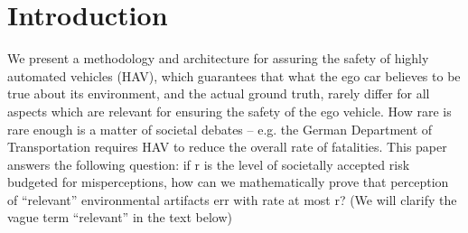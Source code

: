 \section{Introduction}

We present a methodology and architecture for assuring the safety of highly automated vehicles (HAV), which guarantees  that what the ego car believes to be true about its environment, and the actual ground truth, rarely differ for all aspects which are relevant for ensuring the safety of the ego vehicle. How rare is rare enough is a matter of societal debates -- e.g. the German Department of Transportation requires HAV to reduce the overall rate of fatalities. This paper answers the following question: if  r  is the level of societally accepted risk budgeted for misperceptions, how can we mathematically prove that perception of \enquote{relevant} environmental artifacts err with rate at most r? (We will clarify the vague term \enquote{relevant} in the text below)

